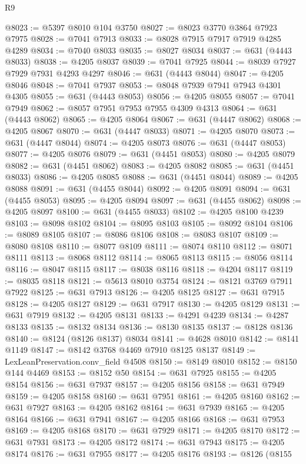 \begin{lexlean}{R9}
\begin{coremodule}
@8023 := @5397 @8010 @104 @3750
@8027 := @8023 @3770 @3864 @7923 @7975
@8028 := @7041 @7913
@8033 := @8028 @7915 @7917 @7919 @4285 @4289
@8034 := @7040 @8033
@8035 := @8027 @8034
@8037 := @631 (@4443 @8033)
@8038 := @4205 @8037
@8039 := @7041 @7925
@8044 := @8039 @7927 @7929 @7931 @4293 @4297
@8046 := @631 (@4443 @8044)
@8047 := @4205 @8046
@8048 := @7041 @7937
@8053 := @8048 @7939 @7941 @7943 @4301 @4305
@8055 := @631 (@4443 @8053)
@8056 := @4205 @8055
@8057 := @7041 @7949
@8062 := @8057 @7951 @7953 @7955 @4309 @4313
@8064 := @631 (@4443 @8062)
@8065 := @4205 @8064
@8067 := @631 (@4447 @8062)
@8068 := @4205 @8067
@8070 := @631 (@4447 @8033)
@8071 := @4205 @8070
@8073 := @631 (@4447 @8044)
@8074 := @4205 @8073
@8076 := @631 (@4447 @8053)
@8077 := @4205 @8076
@8079 := @631 (@4451 @8053)
@8080 := @4205 @8079
@8082 := @631 (@4451 @8062)
@8083 := @4205 @8082
@8085 := @631 (@4451 @8033)
@8086 := @4205 @8085
@8088 := @631 (@4451 @8044)
@8089 := @4205 @8088
@8091 := @631 (@4455 @8044)
@8092 := @4205 @8091
@8094 := @631 (@4455 @8053)
@8095 := @4205 @8094
@8097 := @631 (@4455 @8062)
@8098 := @4205 @8097
@8100 := @631 (@4455 @8033)
@8102 := @4205 @8100 @4239
@8103 := @8098 @8102
@8104 := @8095 @8103
@8105 := @8092 @8104
@8106 := @8089 @8105
@8107 := @8086 @8106
@8108 := @8083 @8107
@8109 := @8080 @8108
@8110 := @8077 @8109
@8111 := @8074 @8110
@8112 := @8071 @8111
@8113 := @8068 @8112
@8114 := @8065 @8113
@8115 := @8056 @8114
@8116 := @8047 @8115
@8117 := @8038 @8116
@8118 := @4204 @8117
@8119 := @8035 @8118
@8121 := @5613 @8010 @3754
@8124 := @8121 @3769 @7911 @7922
@8125 := @631 @7913
@8126 := @4205 @8125
@8127 := @631 @7915
@8128 := @4205 @8127
@8129 := @631 @7917
@8130 := @4205 @8129
@8131 := @631 @7919
@8132 := @4205 @8131
@8133 := @4291 @4239
@8134 := @4287 @8133
@8135 := @8132 @8134
@8136 := @8130 @8135
@8137 := @8128 @8136
@8140 := @8124 (@8126 @8137) @8034
@8141 := @4628 @8010
@8142 := @8141 @1149
@8147 := @8142 @3768 @4469 @7910 @8125 @8137
@8149 := LexLeanPreservation.conv_field @4508
@8150 := @8149 @8010
@8152 := @8150 @144 @4469
@8153 := @8152 @50
@8154 := @631 @7925
@8155 := @4205 @8154
@8156 := @631 @7937
@8157 := @4205 @8156
@8158 := @631 @7949
@8159 := @4205 @8158
@8160 := @631 @7951
@8161 := @4205 @8160
@8162 := @631 @7927
@8163 := @4205 @8162
@8164 := @631 @7939
@8165 := @4205 @8164
@8166 := @631 @7941
@8167 := @4205 @8166
@8168 := @631 @7953
@8169 := @4205 @8168
@8170 := @631 @7929
@8171 := @4205 @8170
@8172 := @631 @7931
@8173 := @4205 @8172
@8174 := @631 @7943
@8175 := @4205 @8174
@8176 := @631 @7955
@8177 := @4205 @8176
@8193 := @8126
    (@8155

\end{coremodule}
\end{lexlean}
